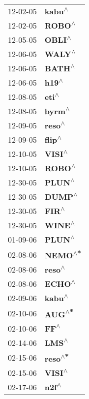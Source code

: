 \begin{supertabular}{p{0.08\textwidth}p{0.2\textwidth}}
 12-02-05 &    \textbf{kabu\textsuperscript{$\wedge$}} \\
 12-02-05 &    \textbf{ROBO\textsuperscript{$\wedge$}} \\
 12-05-05 &    \textbf{OBLI\textsuperscript{$\wedge$}} \\
 12-06-05 &    \textbf{WALY\textsuperscript{$\wedge$}} \\
 12-06-05 &    \textbf{BATH\textsuperscript{$\wedge$}} \\
 12-06-05 &     \textbf{h19\textsuperscript{$\wedge$}} \\
 12-08-05 &     \textbf{eti\textsuperscript{$\wedge$}} \\
 12-08-05 &    \textbf{byrm\textsuperscript{$\wedge$}} \\
 12-09-05 &    \textbf{reso\textsuperscript{$\wedge$}} \\
 12-09-05 &    \textbf{flip\textsuperscript{$\wedge$}} \\
 12-10-05 &    \textbf{VISI\textsuperscript{$\wedge$}} \\
 12-10-05 &    \textbf{ROBO\textsuperscript{$\wedge$}} \\
 12-30-05 &    \textbf{PLUN\textsuperscript{$\wedge$}} \\
 12-30-05 &    \textbf{DUMP\textsuperscript{$\wedge$}} \\
 12-30-05 &     \textbf{FIR\textsuperscript{$\wedge$}} \\
 12-30-05 &    \textbf{WINE\textsuperscript{$\wedge$}} \\
 01-09-06 &    \textbf{PLUN\textsuperscript{$\wedge$}} \\
 02-08-06 &   \textbf{NEMO\textsuperscript{$\wedge$*}} \\
 02-08-06 &    \textbf{reso\textsuperscript{$\wedge$}} \\
 02-08-06 &    \textbf{ECHO\textsuperscript{$\wedge$}} \\
 02-09-06 &    \textbf{kabu\textsuperscript{$\wedge$}} \\
 02-10-06 &    \textbf{AUG\textsuperscript{$\wedge$*}} \\
 02-10-06 &      \textbf{FF\textsuperscript{$\wedge$}} \\
 02-14-06 &     \textbf{LMS\textsuperscript{$\wedge$}} \\
 02-15-06 &   \textbf{reso\textsuperscript{$\wedge$*}} \\
 02-15-06 &    \textbf{VISI\textsuperscript{$\wedge$}} \\
 02-17-06 &     \textbf{n2f\textsuperscript{$\wedge$}} \\

\end{supertabular}
